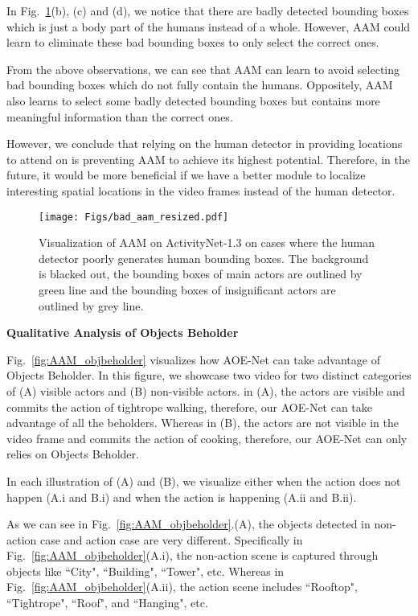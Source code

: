 \documentclass[sn-mathphys]{sn-jnl}
\theoremstyle{thmstyleone}\newtheorem{theorem}{Theorem}\newtheorem{proposition}[theorem]{Proposition}
\theoremstyle{thmstyletwo}\newtheorem{example}{Example}\newtheorem{remark}{Remark}
\theoremstyle{thmstylethree}\newtheorem{definition}{Definition}
\begin{document}
In Fig.~\ref{fig:AAM_bad}(b), (c) and (d), we notice that there are badly detected bounding boxes which is just a body part of the humans instead of a whole. However, AAM could learn to eliminate these bad bounding boxes to only select the correct ones.

From the above observations, we can see that AAM can learn to avoid selecting bad bounding boxes which do not fully contain the humans. Oppositely, AAM also learns to select some badly detected bounding boxes but contains more meaningful information than the correct ones.

However, we conclude that relying on the human detector in providing locations to attend on is preventing AAM to achieve its highest potential. Therefore, in the future, it would be more beneficial if we have a better module to localize interesting spatial locations in the video frames instead of the human detector.

\begin{figure}[!t]
    \centering
    \texttt{[image: Figs/bad\_aam\_resized.pdf]}
    \caption{Visualization of AAM on ActivityNet-1.3 \cite{caba2015activitynet} on cases where the human detector poorly generates human bounding boxes. The background is blacked out, the bounding boxes of main actors are outlined by green line and the bounding boxes of insignificant actors are outlined by grey line.}
    \label{fig:AAM_bad}
\end{figure}

\noindent\textbf{Qualitative Analysis of Objects Beholder}

Fig.~\ref{fig:AAM_objbeholder} visualizes how AOE-Net can take advantage of Objects Beholder.
In this figure, we showcase two video for two distinct categories of (A) visible actors and (B) non-visible actors. in (A), the actors are visible and commits the action of tightrope walking, therefore, our AOE-Net can take advantage of all the beholders. Whereas in (B), the actors are not visible in the video frame and commits the action of cooking, therefore, our AOE-Net can only relies on Objects Beholder.

\noindent In each illustration of (A) and (B), we visualize either when the action does not happen (A.i and B.i) and when the action is happening (A.ii and B.ii).

\noindent As we can see in Fig.~\ref{fig:AAM_objbeholder}.(A), the objects detected in non-action case and action case are very different. Specifically in Fig.~\ref{fig:AAM_objbeholder}(A.i), the non-action scene is captured through objects like ``City", ``Building", ``Tower", etc. Whereas in Fig.~\ref{fig:AAM_objbeholder}(A.ii), the action scene includes ``Rooftop", ``Tightrope", ``Roof", and ``Hanging", etc.
\end{document}
